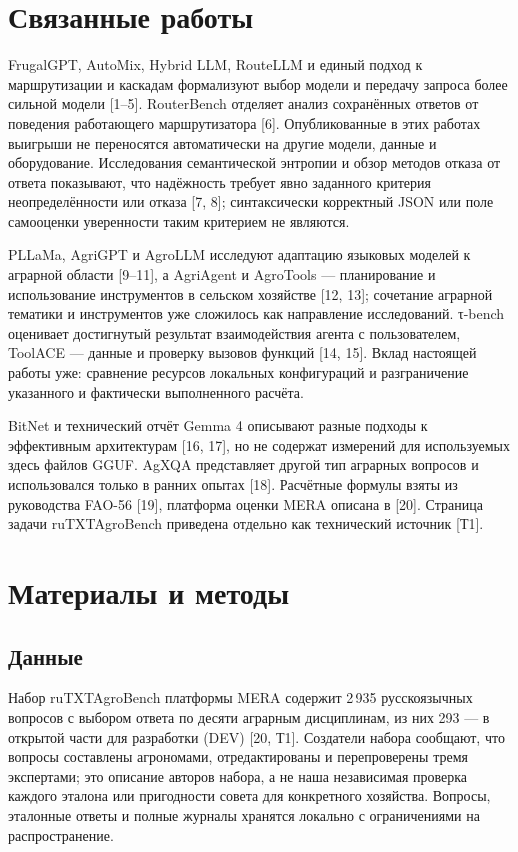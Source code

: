 \documentclass[14pt,a4paper]{extarticle}
\begin{document}
\section*{Связанные работы}
FrugalGPT, AutoMix, Hybrid LLM, RouteLLM и единый подход к маршрутизации и каскадам формализуют выбор модели и передачу запроса более сильной модели [1–5]. RouterBench отделяет анализ сохранённых ответов от поведения работающего маршрутизатора [6]. Опубликованные в этих работах выигрыши не переносятся автоматически на другие модели, данные и оборудование. Исследования семантической энтропии и обзор методов отказа от ответа показывают, что надёжность требует явно заданного критерия неопределённости или отказа [7, 8]; синтаксически корректный JSON или поле самооценки уверенности таким критерием не являются.

PLLaMa, AgriGPT и AgroLLM исследуют адаптацию языковых моделей к аграрной области [9–11], а AgriAgent и AgroTools — планирование и использование инструментов в сельском хозяйстве [12, 13]; сочетание аграрной тематики и инструментов уже сложилось как направление исследований. τ-bench оценивает достигнутый результат взаимодействия агента с пользователем, ToolACE — данные и проверку вызовов функций [14, 15]. Вклад настоящей работы уже: сравнение ресурсов локальных конфигураций и разграничение указанного и фактически выполненного расчёта.

BitNet и технический отчёт Gemma 4 описывают разные подходы к эффективным архитектурам [16, 17], но не содержат измерений для используемых здесь файлов GGUF. AgXQA представляет другой тип аграрных вопросов и использовался только в ранних опытах [18]. Расчётные формулы взяты из руководства FAO-56 [19], платформа оценки MERA описана в [20]. Страница задачи ruTXTAgroBench приведена отдельно как технический источник [Т1].

\section*{Материалы и методы}
\subsection*{Данные}
Набор ruTXTAgroBench платформы MERA содержит 2\,935 русскоязычных вопросов с выбором ответа по десяти аграрным дисциплинам, из них 293 — в открытой части для разработки (DEV) [20, Т1]. Создатели набора сообщают, что вопросы составлены агрономами, отредактированы и перепроверены тремя экспертами; это описание авторов набора, а не наша независимая проверка каждого эталона или пригодности совета для конкретного хозяйства. Вопросы, эталонные ответы и полные журналы хранятся локально с ограничениями на распространение.
\end{document}

